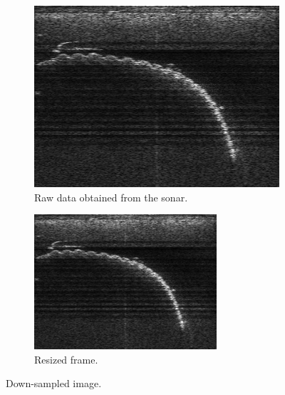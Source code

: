 \begin{figure}[H]
    \centering
    \begin{subfigure}[b]{.45\textwidth}
        \centering
        \includegraphics[width=\textwidth]{figures/pipeline/Original.png}
        \caption{Raw data obtained from the sonar.}
    \end{subfigure}
    \hfill
    \begin{subfigure}[b]{.45\textwidth}
        \centering
        \includegraphics[width=\textwidth]{figures/pipeline/Resized.png}
        \caption{Resized frame.}
    \end{subfigure}
    \caption{Down-sampled image.}
    \label{fig:resizing}
\end{figure}

